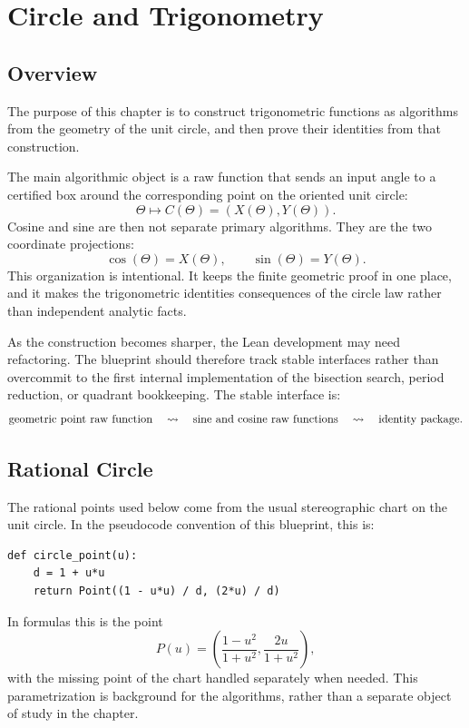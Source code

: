 \chapter{Circle and Trigonometry}
\label{ch:rational-circle-trigonometry}

\section{Overview}

The purpose of this chapter is to construct trigonometric functions as
algorithms from the geometry of the unit circle, and then prove their
identities from that construction.

The main algorithmic object is a raw function that sends an input angle to a
certified box around the corresponding point on the oriented unit circle:
\[
  \Theta \longmapsto C(\Theta)=(X(\Theta),Y(\Theta)).
\]
Cosine and sine are then not separate primary algorithms.  They are the two
coordinate projections:
\[
  \cos(\Theta)=X(\Theta),\qquad \sin(\Theta)=Y(\Theta).
\]
This organization is intentional.  It keeps the finite geometric proof in one
place, and it makes the trigonometric identities consequences of the circle
law rather than independent analytic facts.

As the construction becomes sharper, the Lean development may need
refactoring.  The blueprint should therefore track stable interfaces rather
than overcommit to the first internal implementation of the bisection search,
period reduction, or quadrant bookkeeping.  The stable interface is:
\[
  \hbox{geometric point raw function}
  \quad\leadsto\quad
  \hbox{sine and cosine raw functions}
  \quad\leadsto\quad
  \hbox{identity package}.
\]

\section{Rational Circle}

\begin{remark}
\label{rem:rational-circle-point}
The rational points used below come from the usual stereographic chart on the
unit circle.  In the pseudocode convention of this blueprint, this is:
\begin{verbatim}
def circle_point(u):
    d = 1 + u*u
    return Point((1 - u*u) / d, (2*u) / d)
\end{verbatim}
In formulas this is the point
\[
  P(u)=
  \left(
    \frac{1-u^2}{1+u^2},
    \frac{2u}{1+u^2}
  \right),
\]
with the missing point of the chart handled separately when needed.  This
parametrization is background for the algorithms, rather than a separate
object of study in the chapter.
\end{remark}

